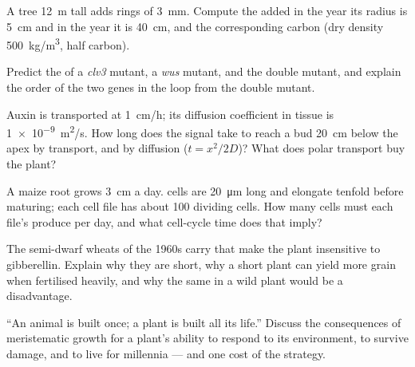 \begin{exercise}[$\star\star$]\label{exo:b2:plant-meristems:7}
A tree \qty{12}{m} tall adds rings of \qty{3}{mm}. Compute the 
added in the year its radius is \qty{5}{cm} and in the year it is
\qty{40}{cm}, and the corresponding carbon (dry density
\qty{500}{kg/m^3}, half carbon).
\end{exercise}

\begin{exercise}[$\star\star$]\label{exo:b2:plant-meristems:8}
Predict the  of a \emph{clv3} mutant, a \emph{wus} mutant,
and the double mutant, and explain the order of the two genes in the
loop from the double mutant.
\end{exercise}

\begin{exercise}[$\star\star$]\label{exo:b2:plant-meristems:9}
Auxin is transported at \qty{1}{cm/h}; its diffusion coefficient in
tissue is \qty{1e-9}{m^2/s}. How long does the signal take to reach
a bud \qty{20}{cm} below the apex by transport, and by diffusion
($t = x^2/2D$)? What does polar transport buy the plant?
\end{exercise}

\begin{exercise}[$\star\star\star$]\label{exo:b2:plant-meristems:10}
A maize root grows \qty{3}{cm} a day.  cells are
\qty{20}{\micro m} long and elongate tenfold before maturing; each
cell file has about \num{100} dividing cells. How many cells must
each file's  produce per day, and what cell-cycle time does
that imply?
\end{exercise}

\begin{exercise}[$\star\star\star$]\label{exo:b2:plant-meristems:11}
The semi-dwarf wheats of the 1960s carry  that make the
plant insensitive to gibberellin. Explain why they are short, why a
short plant can yield more grain when fertilised heavily, and why
the same  in a wild plant would be a disadvantage.
\end{exercise}

\begin{exercise}[$\star\star\star$]\label{exo:b2:plant-meristems:12}
``An animal is built once; a plant is built all its life.'' Discuss
the consequences of meristematic growth for a plant's ability to
respond to its environment, to survive damage, and to live for
millennia --- and one cost of the strategy.
\end{exercise}

